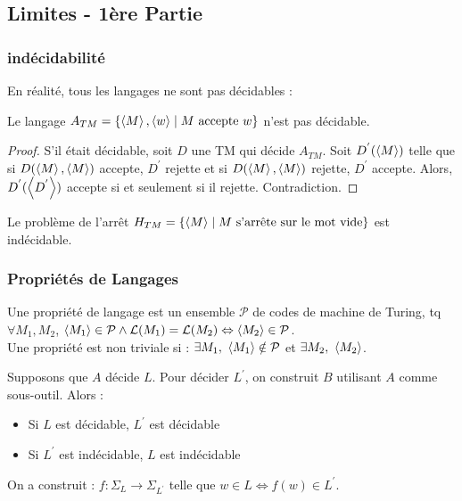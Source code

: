 \documentclass{cours}
\begin{document}
\subsection{Limites - 1ère Partie}
\subsubsection{indécidabilité}
En réalité, tous les langages ne sont pas décidables : 
\begin{proposition}
    Le langage $A_{TM} = \left\{\left\langle M \right\rangle, \left\langle w \right\rangle \mid M \text{ accepte } w\right\}$ n'est pas décidable.
\end{proposition}

\begin{proof}
    S'il était décidable, soit $D$ une TM qui décide $A_{TM}$. Soit $D^{'}(\left\langle M \right\rangle)$ telle que si $D(\left\langle M \right\rangle, \left\langle M \right\rangle)$ accepte, $D^{'}$ rejette et si $D(\left\langle M \right\rangle,\left\langle M \right\rangle)$ rejette, $D^{'}$ accepte. Alors, $D^{'}(\left\langle D^{'} \right\rangle)$ accepte si et seulement si il rejette. Contradiction.
\end{proof}

\begin{proposition}
    Le problème de l'arrêt $H_{TM} = \left\{\left\langle M \right\rangle\mid M \text{ s'arrête sur le mot vide}\right\}$ est indécidable. 
\end{proposition}

\subsubsection{Propriétés de Langages}
\begin{definition}
    Une propriété de langage est un ensemble $\mathcal{P}$ de codes de machine de Turing, tq $\forall M_{1}, M_{2}$, $\left\langle M_{1} \right\rangle \in \mathcal{P} \wedge \mathcal{L}(M_{1}) = \mathcal{L}(M_{2}) \Leftrightarrow \left\langle M_{2} \right\rangle \in \mathcal{P}$. \\
    Une propriété est non triviale si : $\exists M_{1}, \ \left\langle M_{1} \right\rangle \notin \mathcal{P}$ et $\exists M_{2}, \ \left\langle M_{2} \right\rangle$.
\end{definition}

\begin{proposition}
    Supposons que $A$ décide $L$. Pour décider $L^{'}$, on construit $B$ utilisant $A$ comme sous-outil. Alors :
    \begin{itemize}
        \item Si $L$ est décidable, $L^{'}$ est décidable
        \item Si $L^{'}$ est indécidable, $L$ est indécidable
    \end{itemize}
    On a construit : $f : \Sigma_{L} \rightarrow \Sigma_{L^{'}}$ telle que $w\in L \Leftrightarrow f(w) \in L^{'}$.
\end{proposition}
\end{document}
